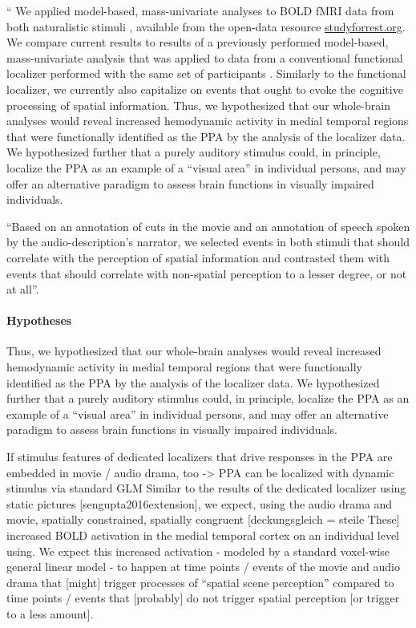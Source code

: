 ``%
We applied model-based, mass-univariate analyses to BOLD fMRI data from both
naturalistic stimuli \citep{hanke2016simultaneous, hanke2014audiomovie},
available from the open-data resource
\href{http://www.studyforrest.org}{studyforrest.org}.
We compare current results to results of a previously performed model-based,
mass-univariate analysis that was applied to data from a conventional functional
localizer performed with the same set of participants
\citep{sengupta2016extension}.
Similarly to the functional localizer, we currently also capitalize on events
that ought to evoke the cognitive processing of spatial information.
Thus, we hypothesized that our whole-brain analyses would reveal increased
hemodynamic activity in medial temporal regions that were functionally
identified as the PPA by the analysis of the localizer data.
We hypothesized further that a purely auditory stimulus could, in principle,
localize the PPA as an example of a ``visual area'' in individual persons,
and may offer an alternative paradigm to assess brain functions in visually
impaired individuals.

%
``Based on an annotation of cuts in the movie and an annotation of speech spoken
by the audio-description's narrator, we selected events in both stimuli that
should correlate with the perception of spatial information and contrasted them
with events that should correlate with non-spatial perception to a lesser
degree, or not at all''.


\paragraph{Hypotheses}

Thus, we hypothesized that our whole-brain analyses would reveal increased
hemodynamic activity in medial temporal regions that were functionally
identified as the PPA by the analysis of the localizer data.
We hypothesized further that a purely auditory stimulus could, in principle,
localize the PPA as an example of a ``visual area'' in individual persons,
and may offer an alternative paradigm to assess brain functions in visually
impaired individuals.


%
If stimulus features of dedicated localizers that drive responses in the PPA are
embedded in movie / audio drama, too -> PPA can be localized with dynamic
stimulus via standard GLM
%
Similar to the results of the dedicated localizer using static pictures
[sengupta2016extension], we expect, using the audio drama and movie, spatially
constrained, spatially congruent [deckungsgleich = steile These] increased BOLD
activation in the medial temporal cortex on an individual level using. We expect
this increased activation - modeled by a standard voxel-wise general linear
model - to happen at time points / events of the movie and audio drama that
[might] trigger processes of “spatial scene perception” compared to time points
/ events that [probably] do not trigger spatial perception [or trigger to a less
amount].


